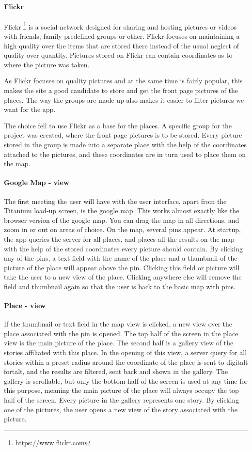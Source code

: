 \documentclass[11pt]{book}
\begin{document}
\paragraph{Flickr}
Flickr \footnote{https://www.flickr.com} is a social network designed for sharing and hosting pictures or videos with friends, family predefined groups or other. Flickr focuses on maintaining a high quality over the items that are stored there instead of the usual neglect of quality over quantity. Pictures stored on Flickr can contain coordinates as to where the picture was taken. 

As Flickr focuses on quality pictures and at the same time is fairly popular, this makes the site a good candidate to store and get the front page pictures of the places. The way the groups are made up also makes it easier to filter pictures we want for the app. 

The choice fell to use Flickr as a base for the places. A specific group for the project was created, where the front page pictures is to be stored. Every picture stored in the group is made into a separate place with the help of the coordinates attached to the pictures, and these coordinates are in turn used to place them on the map.

\paragraph{Google Map - view}
The first meeting the user will have with the user interface, apart from the Titanium load-up screen, is the google map. This works almost exactly like the browser version of the google map. You can drag the map in all directions, and zoom in or out on areas of choice. On the map, several pins appear. At startup, the app queries the server for all places, and places all the results on the map with the help of the stored coordinates every picture should contain. By clicking any of the pins, a text field with the name of the place and a thumbnail of the picture of the place will appear above the pin. Clicking this field or picture will take the user to a new view of the place. Clicking anywhere else will remove the field and thumbnail again so that the user is back to the basic map with pins.

\paragraph{Place - view}
If the thumbnail or text field in the map view is clicked, a new view over the place associated with the pin is opened. The top half of the screen in the place view is the main picture of the place. The second half is a gallery view of the stories affiliated with this place. In the opening of this view, a server query for all stories within a preset radius around the coordinate of the place is sent to digitalt fortalt, and the results are filtered, sent back and shown in the gallery. The gallery is scrollable, but only the bottom half of the screen is used at any time for this purpose, meaning the main picture of the place will always occupy the top half of the screen. Every picture in the gallery represents one story. By clicking one of the pictures, the user opens a new view of the story associated with the picture.
\end{document}
